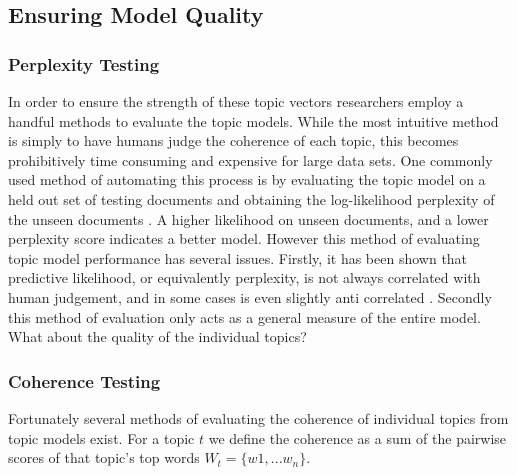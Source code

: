 \subsection{Ensuring Model Quality}
\subsubsection{Perplexity Testing}
In order to ensure the strength of these topic vectors researchers employ a handful methods to evaluate the topic models. While the most intuitive method is simply to have humans judge the coherence of each topic, this becomes prohibitively time consuming and expensive for large data sets. One commonly used method of automating this process is by evaluating the topic model on a held out set of testing documents and obtaining the log-likelihood perplexity of the unseen documents \parencite{Blei:2003:LDA:944919.944937, wallach-murray-rsalakhu-mimno-2009}. A higher likelihood on unseen documents, and a lower perplexity score indicates a better model. However this method of evaluating topic model performance has several issues. Firstly, it has been shown that predictive likelihood, or equivalently perplexity, is not always correlated with human judgement, and in some cases is even slightly anti correlated \parencite{Chang:Boyd-Graber:Wang:Gerrish:Blei-2009}. Secondly this method of evaluation only acts as a general measure of the entire model. What about the quality of the individual topics?




\subsubsection{Coherence Testing}
Fortunately several methods of evaluating the coherence of individual topics from topic models exist. For a topic $t$ we define the  coherence as a sum of the pairwise scores of that topic's top words  $W_t =  \{w1, ... w_n\}$. 

